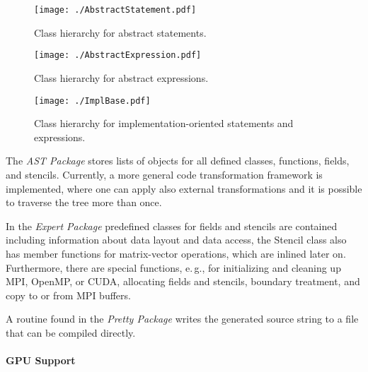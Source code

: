 \documentclass[onecolumn]{svjour3}
\begin{document}
\begin{figure}[ht!]
\begin{center}
\texttt{[image: ./AbstractStatement.pdf]}
\caption[Partitioning of a cell-centered grid into four sub-grids]{Class hierarchy for abstract statements.}
\label{fig:scalaabstractstate}
\end{center}
\end{figure}

\begin{figure}[ht!]
\begin{center}
\texttt{[image: ./AbstractExpression.pdf]}
\caption[Partitioning of a cell-centered grid into four sub-grids]{Class hierarchy for abstract expressions.}
\label{fig:scalaabstractexpr}
\end{center}
\end{figure}


\begin{figure}[ht!]
\begin{center}
\texttt{[image: ./ImplBase.pdf]}
\caption[Partitioning of a cell-centered grid into four sub-grids]{Class hierarchy for implementation-oriented statements and expressions.}
\label{fig:scalaimpl}
\end{center}
\end{figure}

The \textit{AST Package} stores lists of objects for all defined classes, functions, fields, and stencils.
Currently, a more general code transformation framework is implemented, where one can apply also external transformations and it is possible to traverse the tree more than once. 

In the \textit{Expert Package} predefined classes for fields and stencils are contained including information about data layout and data access, the Stencil class also has member functions for matrix-vector operations, which are inlined later on. Furthermore, there are special functions, e.\,g., for initializing and cleaning up MPI, OpenMP, or CUDA, allocating fields and stencils, boundary treatment, and copy to or from MPI buffers.




A routine found in the \textit{Pretty Package} writes the generated source string to a file that can be compiled directly.

\paragraph{GPU Support}
\end{document}
